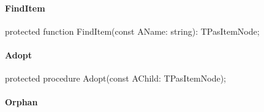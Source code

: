 \documentclass{report}
\newif\ifpdf
\begin{document}
\paragraph*{FindItem}\hspace*{\fill}

\label{PasDoc_HierarchyTree.TPasItemNode-FindItem}
\begin{list}{}{
\setlength{\itemindent}{0cm}
\setlength{\listparindent}{0cm}
\setlength{\leftmargin}{\evensidemargin}
\addtolength{\leftmargin}{\tmplength}
\settowidth{\labelsep}{X}
\addtolength{\leftmargin}{\labelsep}
\setlength{\labelwidth}{\tmplength}
}
\item[\textbf{Declaration}\hfill]
\ifpdf
\begin{flushleft}
\fi
\begin{ttfamily}
protected function FindItem(const AName: string): TPasItemNode;\end{ttfamily}

\ifpdf
\end{flushleft}
\fi

\end{list}
\paragraph*{Adopt}\hspace*{\fill}

\label{PasDoc_HierarchyTree.TPasItemNode-Adopt}
\begin{list}{}{
\setlength{\itemindent}{0cm}
\setlength{\listparindent}{0cm}
\setlength{\leftmargin}{\evensidemargin}
\addtolength{\leftmargin}{\tmplength}
\settowidth{\labelsep}{X}
\addtolength{\leftmargin}{\labelsep}
\setlength{\labelwidth}{\tmplength}
}
\item[\textbf{Declaration}\hfill]
\ifpdf
\begin{flushleft}
\fi
\begin{ttfamily}
protected procedure Adopt(const AChild: TPasItemNode);\end{ttfamily}

\ifpdf
\end{flushleft}
\fi

\end{list}
\paragraph*{Orphan}\hspace*{\fill}
\end{document}
